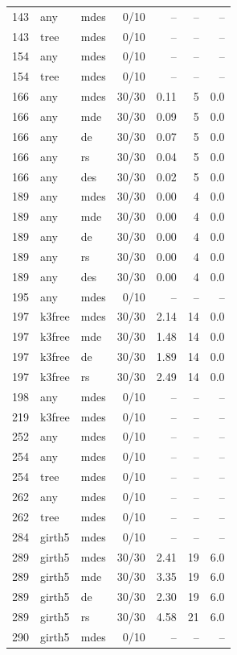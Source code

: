\begin{tabular}{rl l rrr r}
143 & any & mdes & 0/10 & -- & -- & --\\
143 & tree & mdes & 0/10 & -- & -- & --\\
154 & any & mdes & 0/10 & -- & -- & --\\
154 & tree & mdes & 0/10 & -- & -- & --\\
166 & any & mdes & 30/30 & 0.11 & 5 & 0.0\\
166 & any & mde & 30/30 & 0.09 & 5 & 0.0\\
166 & any & de & 30/30 & 0.07 & 5 & 0.0\\
166 & any & rs & 30/30 & 0.04 & 5 & 0.0\\
166 & any & des & 30/30 & 0.02 & 5 & 0.0\\
189 & any & mdes & 30/30 & 0.00 & 4 & 0.0\\
189 & any & mde & 30/30 & 0.00 & 4 & 0.0\\
189 & any & de & 30/30 & 0.00 & 4 & 0.0\\
189 & any & rs & 30/30 & 0.00 & 4 & 0.0\\
189 & any & des & 30/30 & 0.00 & 4 & 0.0\\
195 & any & mdes & 0/10 & -- & -- & --\\
197 & k3free & mdes & 30/30 & 2.14 & 14 & 0.0\\
197 & k3free & mde & 30/30 & 1.48 & 14 & 0.0\\
197 & k3free & de & 30/30 & 1.89 & 14 & 0.0\\
197 & k3free & rs & 30/30 & 2.49 & 14 & 0.0\\
198 & any & mdes & 0/10 & -- & -- & --\\
219 & k3free & mdes & 0/10 & -- & -- & --\\
252 & any & mdes & 0/10 & -- & -- & --\\
254 & any & mdes & 0/10 & -- & -- & --\\
254 & tree & mdes & 0/10 & -- & -- & --\\
262 & any & mdes & 0/10 & -- & -- & --\\
262 & tree & mdes & 0/10 & -- & -- & --\\
284 & girth5 & mdes & 0/10 & -- & -- & --\\
289 & girth5 & mdes & 30/30 & 2.41 & 19 & 6.0\\
289 & girth5 & mde & 30/30 & 3.35 & 19 & 6.0\\
289 & girth5 & de & 30/30 & 2.30 & 19 & 6.0\\
289 & girth5 & rs & 30/30 & 4.58 & 21 & 6.0\\
290 & girth5 & mdes & 0/10 & -- & -- & --\\

\end{tabular}
